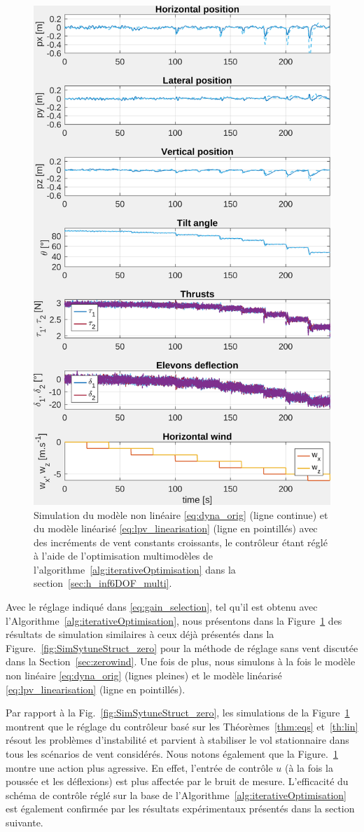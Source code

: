 \begin{figure}[ht!]
    \centering
    \includegraphics[trim=0cm 0cm 0cm 0cm,clip,width=0.6\columnwidth]{figures/sim_systune_lpv_noise.png}
    \caption{Simulation du modèle non linéaire \eqref{eq:dyna_orig} (ligne continue) et du modèle linéarisé \eqref{eq:lpv_linearisation} (ligne en pointillés) avec des incréments de vent constants croissants, le contrôleur étant réglé à l'aide de l'optimisation multimodèles de l'algorithme~\ref{alg:iterativeOptimisation} dans la section~\ref{sec:h_inf6DOF_multi}.}
    \label{fig:SimSytuneStruct_lpv}
\end{figure}

Avec le réglage indiqué dans \eqref{eq:gain_selection}, tel qu'il est obtenu avec l'Algorithme~\ref{alg:iterativeOptimisation}, nous présentons dans la Figure~\ref{fig:SimSytuneStruct_lpv} des résultats de simulation similaires à ceux déjà présentés dans la Figure.~\ref{fig:SimSytuneStruct_zero} pour la méthode de réglage sans vent discutée dans la Section~\ref{sec:zerowind}. Une fois de plus, nous simulons à la fois le modèle non linéaire \eqref{eq:dyna_orig} (lignes pleines) et le modèle linéarisé \eqref{eq:lpv_linearisation} (ligne en pointillés). 

Par rapport à la Fig.~\ref{fig:SimSytuneStruct_zero}, les simulations de la Figure~\ref{fig:SimSytuneStruct_lpv} montrent que le réglage du contrôleur basé sur les Théorèmes~\ref{thm:eqs} et~\ref{th:lin} résout les problèmes d'instabilité et parvient à stabiliser le vol stationnaire dans tous les scénarios de vent considérés. Nous notons également que la Figure.~\ref{fig:SimSytuneStruct_lpv} montre une action plus agressive. En effet, l'entrée de contrôle $u$ (à la fois la poussée et les déflexions) est plus affectée par le bruit de mesure.
L'efficacité du schéma de contrôle réglé sur la base de l'Algorithme~\ref{alg:iterativeOptimisation} est également confirmée par les résultats expérimentaux présentés dans la section suivante.



